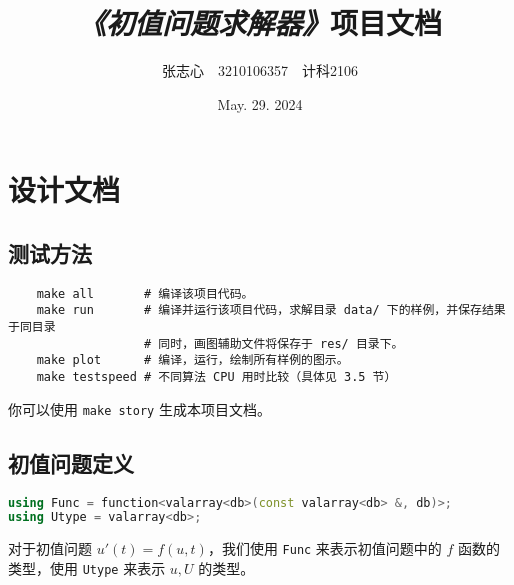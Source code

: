 \documentclass[lang=cn,a4paper,newtx,bibend=bibtex]{elegantpaper}
\title{\emph{《初值问题求解器》}项目文档}
\author{张志心~~3210106357~~计科2106}
\date{May. 29. 2024}
\begin{document}
\maketitle

\tableofcontents
\newpage

\section{设计文档}

\subsection{测试方法}

\begin{verbatim}
    make all       # 编译该项目代码。
    make run       # 编译并运行该项目代码，求解目录 data/ 下的样例，并保存结果于同目录
                   # 同时，画图辅助文件将保存于 res/ 目录下。
    make plot      # 编译，运行，绘制所有样例的图示。
    make testspeed # 不同算法 CPU 用时比较（具体见 3.5 节）
\end{verbatim}

你可以使用 \texttt{make story} 生成本项目文档。

\subsection{初值问题定义}
\begin{lstlisting}[language=C++]
using Func = function<valarray<db>(const valarray<db> &, db)>;
using Utype = valarray<db>;
\end{lstlisting}
对于初值问题 $u'(t)=f(u, t)$，我们使用 \lstinline{Func} 来表示初值问题中的 $f$ 函数的类型，使用 \lstinline{Utype} 来表示 $u,U$ 的类型。
\end{document}
